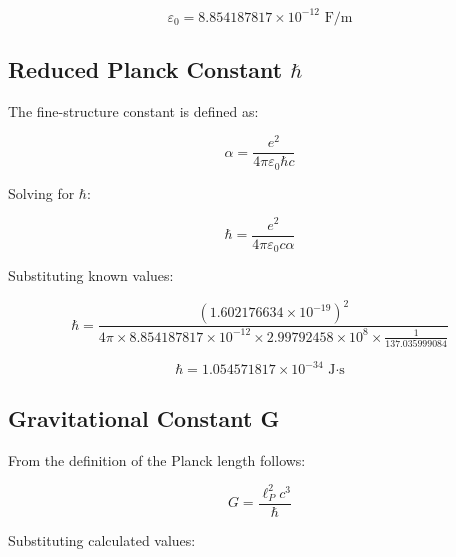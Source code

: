 	\begin{tcolorbox}[colback=green!5!white,colframe=green!75!black,title=Vacuum Permittivity]
		\begin{equation}
			\boxed{\varepsilon_0 = 8.854187817 \times 10^{-12} \text{ F/m}}
		\end{equation}
	\end{tcolorbox}
	
	\subsection{Reduced Planck Constant $\hbar$}
	
	The fine-structure constant is defined as:
	
	\begin{equation}
		\alpha = \frac{e^2}{4\pi\varepsilon_0\hbar c}
	\end{equation}
	
	Solving for $\hbar$:
	
	\begin{equation}
		\hbar = \frac{e^2}{4\pi\varepsilon_0 c \alpha}
	\end{equation}
	
	Substituting known values:
	
	\begin{equation}
		\hbar = \frac{(1.602176634 \times 10^{-19})^2}{4\pi \times 8.854187817 \times 10^{-12} \times 2.99792458 \times 10^8 \times \frac{1}{137.035999084}}
	\end{equation}
	
	\begin{tcolorbox}[colback=green!5!white,colframe=green!75!black,title=Reduced Planck Constant]
		\begin{equation}
			\boxed{\hbar = 1.054571817 \times 10^{-34} \text{ J·s}}
		\end{equation}
	\end{tcolorbox}
	
	\subsection{Gravitational Constant G}
	
	From the definition of the Planck length follows:
	
	\begin{equation}
		G = \frac{\ell_P^2 c^3}{\hbar}
	\end{equation}
	
	Substituting calculated values:
	
